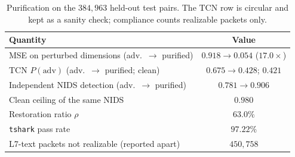 \documentclass[acmtog,nonacm,pbalance]{acmart}
\begin{document}
\begin{table}[t]
  \caption{Purification on the $384{,}963$ held-out test pairs. The TCN row is
  circular and kept as a sanity check; compliance counts realizable packets only.}
  \label{tab:purif}
  \footnotesize
  \setlength{\tabcolsep}{4pt}
  \begin{tabular}{@{}lc@{}}
    \toprule
    Quantity & Value \\
    \midrule
    MSE on perturbed dimensions (adv.\ $\rightarrow$ purified) & $0.918 \rightarrow 0.054$ ($17.0\times$) \\
    TCN $P(\text{adv})$ (adv.\ $\rightarrow$ purified; clean) & $0.675 \rightarrow 0.428$; $0.421$ \\
    Independent NIDS detection (adv.\ $\rightarrow$ purified) & $0.781 \rightarrow 0.906$ \\
    Clean ceiling of the same NIDS & $0.980$ \\
    Restoration ratio $\rho$ & $\mathbf{63.0\%}$ \\
    \texttt{tshark} pass rate & $\mathbf{97.22\%}$ \\
    L7-text packets not realizable (reported apart) & $450{,}758$ \\
    \bottomrule
  \end{tabular}
\end{table}
\end{document}
